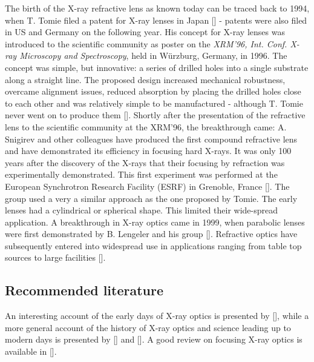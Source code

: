 \begin{refsection}
The birth of the X-ray refractive lens as known today can be traced back to 1994, when T. Tomie filed a patent for X-ray lenses in Japan [\cite{Tomie1994}] - patents were also filed in US and Germany on the following year. His concept for X-ray lenses was introduced to the scientific community as poster on the \textit{XRM'96, Int. Conf. X-ray Microscopy and Spectroscopy}, held in W\"urzburg, Germany, in 1996. The concept was simple, but innovative: a series of drilled holes into a single substrate along a straight line. The proposed design increased mechanical robustness, overcame alignment issues, reduced absorption by placing the drilled holes close to each other and was relatively simple to be manufactured - although T. Tomie never went on to produce them [\cite{Tomie2010}]. Shortly after the presentation of the refractive lens to the scientific community at the XRM'96, the breakthrough came: A. Snigirev and other colleagues have produced the first compound refractive lens and have demonstrated its efficiency in focusing hard X-rays. It was only 100 years after the discovery of the X-rays that their focusing by refraction was experimentally demonstrated. This first experiment was performed at the European Synchrotron Research Facility (ESRF) in  Grenoble, France [\cite{Snigirev1996}]. The group used a very a similar approach as the one proposed by Tomie. The early lenses had a cylindrical or spherical shape. This limited their wide-spread application. A breakthrough in X-ray optics came in 1999, when parabolic lenses were first demonstrated by B. Lengeler and his group [\cite{Lengeler1999,Lengeler2001}]. Refractive optics have subsequently entered into widespread use in applications ranging from table top sources to large facilities [\cite{Snigirev2008}].

\subsection*{Recommended literature}

An interesting account of the early days of X-ray optics is presented by [\cite{Compton1928, Compton1931}], while a more general account of the history of X-ray optics and science leading up to modern days is presented by [\cite[\textit{§1}]{Willmott2019}] and [\cite[\textit{§2}]{Jacobsen2019}]. A good review on focusing X-ray optics is available in [\cite{Ice2011,Macrander2017}].


\end{refsection}
